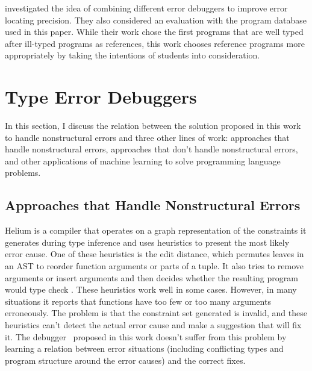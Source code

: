 \documentclass[12pt]{report}	%
\begin{document}
\cite{chen2014let} investigated the idea
of combining different error debuggers to improve
error locating precision. They also considered
an evaluation with the program database used
in this paper. While their work
chose the first programs that are well typed after
ill-typed programs as references, this work chooses
reference programs more appropriately by taking the
intentions of students into consideration.

\section{Type Error Debuggers}
\label{sec:reivew:debugger}

In this section, I discuss the relation between the solution proposed in this work to handle nonstructural errors and
three other lines of work: approaches that handle nonstructural errors, approaches that don't handle nonstructural errors,
and other applications of machine learning to solve programming language problems.

\subsection{Approaches that Handle Nonstructural Errors}

Helium \cite{Hage07:HTE} is a compiler that operates
on a graph representation of the constraints it generates
during type inference
and uses heuristics to present the most likely error cause. One
of these heuristics is the edit distance, which permutes leaves in
an AST to reorder function arguments or parts of a
tuple. It also tries to remove arguments or insert arguments and
then decides whether the resulting program would type check \cite{Heeren03:HLH}.
These heuristics work well in some cases. However, in many situations it
reports that functions have too few or too many arguments erroneously.
%
The problem is that the constraint
set generated is invalid, and these heuristics can't detect
the actual error cause and make a suggestion that will fix it.
%
The debugger \newCompiler\ proposed in this work doesn't suffer from this problem by learning
a relation between error situations (including conflicting types
and program structure around the error causes) and the correct fixes.
\end{document}
